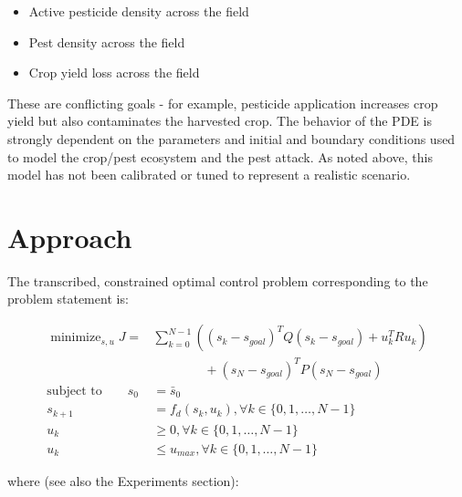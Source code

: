\documentclass[11pt]{article}
\DeclareMathOperator*{\minimize}{minimize}
\begin{document}
\begin{itemize}
\setlength\itemsep{-1pt}
\item Active pesticide density across the field
\item Pest density across the field
\item Crop yield loss across the field
\end{itemize}

These are conflicting goals - for example, pesticide application increases crop yield but also contaminates the harvested crop. The behavior of the PDE is strongly dependent on the parameters and initial and boundary conditions used to model the crop/pest ecosystem and the pest attack. As noted above, this model has not been calibrated or tuned to represent a realistic scenario.

\section{Approach}

The transcribed, constrained optimal control problem corresponding to the problem statement is:

\begin{align}
\label{eqn:ocp}
\minimize_{s,u} J=& \sum_{k=0}^{N-1} \left( (s_k - s_{goal})^T Q (s_k - s_{goal}) + u_k^T R u_k \right) \\
	     & \qquad \qquad  + (s_N - s_{goal})^T P (s_N - s_{goal}) \nonumber  \\
\text{subject to} \qquad s_0 &= \bar{s}_0 \nonumber \\
s_{k+1} &= f_d(s_k, u_k), \forall k \in \{ 0,1,\dots , N-1 \} \nonumber \\
u_k &\geq 0, \forall k \in \{ 0,1,\dots, N-1\} \nonumber \\	   
u_k &\leq u_{max}, \forall k \in \{ 0,1,\dots, N-1 \} \nonumber	     
\end{align}
 
where (see also the Experiments section):
\end{document}
